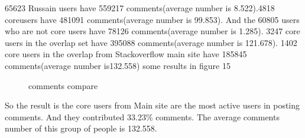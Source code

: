 \documentclass[A4paper,twoside,twocolumn]{article}
\begin{document}
65623 Russain users have 559217 comments(average number is 8.522).4818 coreusers have 481091 comments(average number is 99.853). And the 60805 users who are not core users have 78126 comments(average number is 1.285).
3247 core users in the overlap set have 395088 comments(average number is 121.678).
1402 core users in the overlap from Stackoverflow main site have 185845 comments(average number is132.558)
some results in figure 15
 \begin{figure}[H]
 		\centering 
	\caption{comments compare}
	\label{fig} 

  	\end{figure}
So the result is the core users from Main site are the most active users in posting comments. And they contributed 33.23\% comments. The average comments number of this group of people is 132.558.
\end{document}
